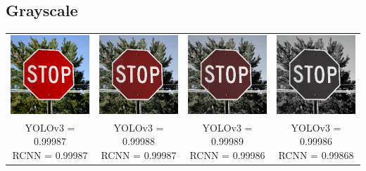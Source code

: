 \documentclass{article}
\begin{document}
\subsection{Grayscale}
\begin{center}
\begin{tabular}{ c c c c }
    \includegraphics[width=0.2\linewidth]{../test_images/stop.png} & \includegraphics[width=0.2\linewidth]{../test_images/perturbed/stop_grayscale_0_500.png} & \includegraphics[width=0.2\linewidth]{../test_images/perturbed/stop_grayscale_0_250.png} & \includegraphics[width=0.2\linewidth]{../test_images/perturbed/stop_grayscale_0_010.png} \\
    \makecell{YOLOv3 = 0.99987 \\ RCNN = 0.99987} & \makecell{YOLOv3 = 0.99988 \\ RCNN = 0.99987} & \makecell{YOLOv3 = 0.99989 \\ RCNN = 0.99986} & \makecell{YOLOv3 = 0.99986 \\ RCNN = 0.99868} \\  

\end{tabular}
\end{center}
\end{document}
